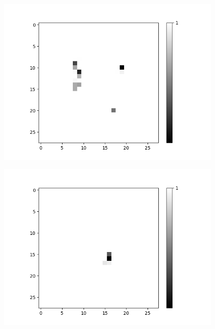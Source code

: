 \begin{figure}[H]
	\centering
	\begin{minipage}[b]{0.19\textwidth}
		\captionsetup{labelformat=empty}
		\includegraphics[width=\textwidth]{LoAE(AND)(20LF)/True/Feature-0.png}
		\label{}
	\end{minipage}
	\begin{minipage}[b]{0.19\textwidth}
		\captionsetup{labelformat=empty}
		\includegraphics[width=\textwidth]{LoAE(AND)(20LF)/True/Feature-4.png}
		\label{}
	\end{minipage}
	\begin{minipage}[b]{0.19\textwidth}
		\captionsetup{labelformat=empty}

\end{minipage}
\end{figure}
